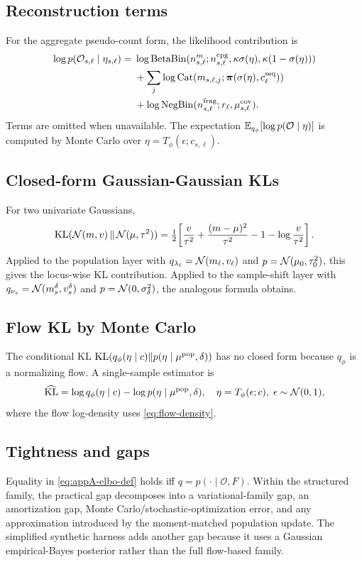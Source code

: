 \subsection*{Reconstruction terms}
For the aggregate pseudo-count form, the likelihood contribution is
\begin{align}
\log p(\mathcal{O}_{s,\ell}\mid\eta_{s,\ell})
=\;& \log\mathrm{BetaBin}(n^m_{s,\ell};n^{\mathrm{cpg}}_{s,\ell},\kappa\sigma(\eta),\kappa(1-\sigma(\eta)))\nonumber\\
&+\sum_j \log\mathrm{Cat}(m_{s,\ell,j};\boldsymbol{\pi}(\sigma(\eta),c^{\mathrm{seq}}_\ell))\nonumber\\
&+\log\mathrm{NegBin}(n^{\mathrm{frag}}_{s,\ell};r_\ell,\mu^{\mathrm{cov}}_{s,\ell}).
\end{align}
Terms are omitted when unavailable. The expectation $\mathbb{E}_{q_\phi}[\log p(\mathcal{O}\mid\eta)]$ is computed by Monte Carlo over $\eta=T_\phi(\epsilon;c_{s,\ell})$.

\subsection*{Closed-form Gaussian-Gaussian KLs}
For two univariate Gaussians,
\begin{equation}
\mathrm{KL}(\mathcal{N}(m,v)\,\|\,\mathcal{N}(\mu,\tau^2)) = \tfrac{1}{2}\!\left[\frac{v}{\tau^2} + \frac{(m-\mu)^2}{\tau^2} - 1 - \log\frac{v}{\tau^2}\right].
\label{eq:appA-gauss-kl}
\end{equation}
Applied to the population layer with $q_{\lambda_\ell}=\mathcal{N}(m_\ell,v_\ell)$ and $p=\mathcal{N}(\mu_0,\tau_0^2)$, this gives the locus-wise KL contribution. Applied to the sample-shift layer with $q_{\nu_s}=\mathcal{N}(m_s^\delta,v_s^\delta)$ and $p=\mathcal{N}(0,\sigma_\delta^2)$, the analogous formula obtains.

\subsection*{Flow KL by Monte Carlo}
The conditional KL $\mathrm{KL}(q_\phi(\eta\mid c)\|p(\eta\mid\mu^{\mathrm{pop}},\delta))$ has no closed form because $q_\phi$ is a normalizing flow. A single-sample estimator is
\begin{equation}
\widehat{\mathrm{KL}} = \log q_\phi(\eta\mid c) - \log p(\eta\mid \mu^{\mathrm{pop}},\delta),\quad \eta = T_\phi(\epsilon;c),\;\epsilon\sim\mathcal{N}(0,1),
\end{equation}
where the flow log-density uses \eqref{eq:flow-density}.

\subsection*{Tightness and gaps}
Equality in \eqref{eq:appA-elbo-def} holds iff $q=p(\cdot\mid\mathcal{O},F)$. Within the structured family, the practical gap decomposes into a variational-family gap, an amortization gap, Monte Carlo/stochastic-optimization error, and any approximation introduced by the moment-matched population update. The simplified synthetic harness adds another gap because it uses a Gaussian empirical-Bayes posterior rather than the full flow-based family.
